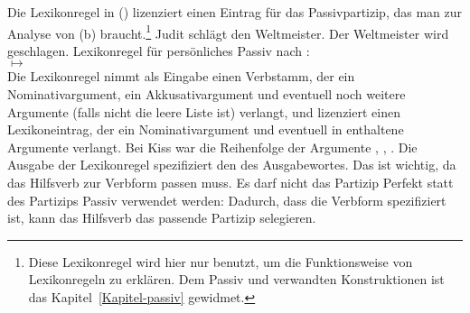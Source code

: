 Die Lexikonregel in () lizenziert einen Eintrag für das Passivpartizip,
das man zur Analyse von (b) braucht.\footnote{
  Diese Lexikonregel wird hier nur benutzt, um die Funktionsweise von Lexikonregeln zu erklären.
  Dem Passiv und verwandten Konstruktionen ist das Kapitel~\ref{Kapitel-passiv} gewidmet.%
}
\eal
\ex Judit schlägt den Weltmeister.
\ex Der Weltmeister wird geschlagen.
\zl
\ea
\label{pass-lr-mlr}
Lexikonregel für persönliches Passiv nach \citet{Kiss92}:\\
 $\mapsto$ \\
\z
Die Lexikonregel nimmt als Eingabe einen Verbstamm, der ein Nominativargument, ein Akkusativargument
und eventuell noch weitere Argumente (falls  
nicht die leere Liste ist) verlangt, und lizenziert einen Lexikoneintrag, der ein Nominativargument 
und eventuell in  enthaltene Argumente verlangt. Bei Kiss war die Reihenfolge der Argumente
, , . Die Ausgabe der Lexikonregel spezifiziert
den \vformw des Ausgabewortes. Das ist wichtig, da das Hilfsverb zur Verbform passen muss. Es darf \zb
nicht das Partizip Perfekt statt des Partizips Passiv verwendet werden:
\eal
{}
\zl
Dadurch, dass die Verbform spezifiziert ist, kann das Hilfsverb das passende Partizip selegieren.

